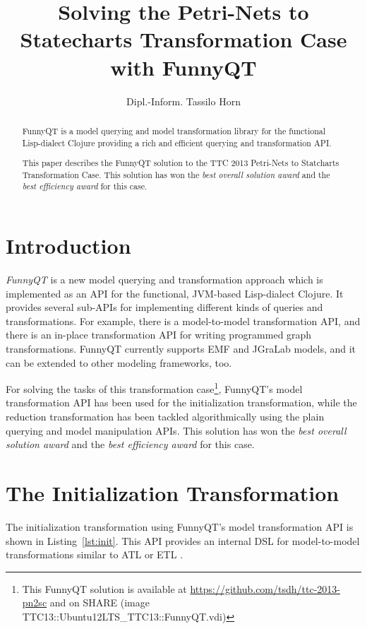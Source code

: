 \documentclass[submission]{eptcs}
\title{Solving the Petri-Nets to Statecharts Transformation Case with FunnyQT}
\author{Dipl.-Inform. Tassilo Horn
  \email{horn@uni-koblenz.de}
  \institute{Institute for Software Technology, University Koblenz-Landau, Germany}}
\begin{document}
\maketitle

\begin{abstract}
  FunnyQT is a model querying and model transformation library for the
  functional Lisp-dialect Clojure providing a rich and efficient querying and
  transformation API.

  This paper describes the FunnyQT solution to the TTC 2013 Petri-Nets to
  Statcharts Transformation Case.  This solution has won the \emph{best overall
    solution award} and the \emph{best efficiency award} for this case.
\end{abstract}

\section{Introduction}
\label{sec:introduction}

\emph{FunnyQT} is a new model querying and transformation approach which is
implemented as an API for the functional, JVM-based Lisp-dialect Clojure.  It
provides several sub-APIs for implementing different kinds of queries and
transformations.  For example, there is a model-to-model transformation API,
and there is an in-place transformation API for writing programmed graph
transformations.  FunnyQT currently supports EMF and JGraLab models, and it can
be extended to other modeling frameworks, too.

For solving the tasks of this transformation case\footnote{This FunnyQT
  solution is available at \url{https://github.com/tsdh/ttc-2013-pn2sc} and on
  SHARE (image
  \textsf{TTC13::Ubuntu12LTS\_TTC13::FunnyQT.vdi})\label{fn:github}}, FunnyQT's
model transformation API has been used for the initialization transformation,
while the reduction transformation has been tackled algorithmically using the
plain querying and model manipulation APIs.  This solution has won the
\emph{best overall solution award} and the \emph{best efficiency award} for
this case.

\section{The Initialization Transformation}
\label{sec:init-transformation}

The initialization transformation using FunnyQT's model transformation API is
shown in Listing~\ref{lst:init}.  This API provides an internal DSL
\cite{book:Fowler2010DSL} for model-to-model transformations similar to ATL
\cite{ATL05} or ETL \cite{booklet:epsilon}.
\end{document}
